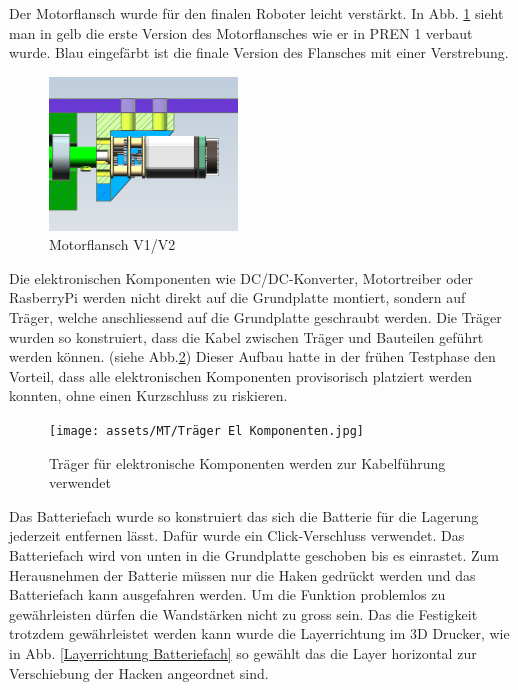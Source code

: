 Der Motorflansch wurde für den finalen Roboter leicht verstärkt. In  Abb. \ref{fig: Motorflansch V1/V2} sieht man in gelb die erste Version des Motorflansches wie er in PREN 1 verbaut wurde. Blau eingefärbt ist die finale Version des Flansches mit einer Verstrebung. 

\begin{figure}[H]
\centering
\includegraphics[width=5cm]{assets/MT/Motorflansch Vergleich.png}
\caption{Motorflansch V1/V2}
\label{fig: Motorflansch V1/V2}
\end{figure}

Die elektronischen Komponenten wie DC/DC-Konverter, Motortreiber oder RasberryPi werden nicht direkt auf die Grundplatte montiert, sondern auf Träger, welche anschliessend auf die Grundplatte geschraubt werden. Die Träger wurden so konstruiert, dass die Kabel zwischen Träger und Bauteilen geführt werden können. (siehe Abb.\ref{fig: Träger für elektronische Komponenten}) Dieser Aufbau hatte in der frühen Testphase den Vorteil, dass alle elektronischen Komponenten provisorisch platziert werden konnten, ohne einen Kurzschluss zu riskieren. 

\begin{figure}[H]
\centering
\texttt{[image: assets/MT/Träger El Komponenten.jpg]}
\caption{Träger für elektronische Komponenten werden zur Kabelführung verwendet}
\label{fig: Träger für elektronische Komponenten}
\end{figure}

Das Batteriefach wurde so konstruiert das sich die Batterie für die Lagerung jederzeit entfernen lässt. Dafür wurde ein Click-Verschluss verwendet. Das Batteriefach wird von unten in die Grundplatte geschoben bis es einrastet. Zum Herausnehmen der Batterie müssen nur die Haken gedrückt werden und das Batteriefach kann ausgefahren werden. Um die Funktion problemlos zu gewährleisten dürfen die Wandstärken nicht zu gross sein. Das die Festigkeit trotzdem gewährleistet werden kann wurde die Layerrichtung im 3D Drucker, wie in Abb. \ref{Layerrichtung Batteriefach} so gewählt das die Layer horizontal zur Verschiebung der Hacken angeordnet sind. 


